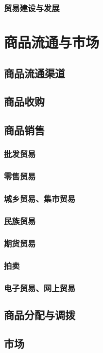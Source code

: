\documentclass[UTF8]{../../RepresentationUniverse}
\begin{document}
    \subsubsection{贸易建设与发展}
\section{商品流通与市场}
    \subsection{商品流通渠道}
    \subsection{商品收购}
    \subsection{商品销售}
        \subsubsection{批发贸易}
        \subsubsection{零售贸易}
        \subsubsection{城乡贸易、集市贸易}
        \subsubsection{民族贸易}
        \subsubsection{期货贸易}
        \subsubsection{拍卖}
        \subsubsection{电子贸易、网上贸易}
    \subsection{商品分配与调拨}
    \subsection{市场}
\end{document}
